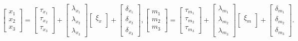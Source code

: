 \documentclass[
  man]{apa7}
\begin{document}
\begin{align}
    \begin{bmatrix}
        x_{1} \\
        x_{2} \\ 
        x_{3}
    \end{bmatrix} =
    \begin{bmatrix}
        \tau_{x_{1}} \\
        \tau_{x_{2}} \\ 
        \tau_{x_{3}}
    \end{bmatrix} +
    \begin{bmatrix}
        \lambda_{x_{1}} \\
        \lambda_{x_{2}} \\ 
        \lambda_{x_{3}}
    \end{bmatrix}
    \begin{bmatrix}
        \xi_{x} \\
    \end{bmatrix} +
    \begin{bmatrix}
        \delta_{x_{1}} \\
        \delta_{x_{2}} \\ 
        \delta_{x_{3}}
    \end{bmatrix}, %
    \begin{bmatrix}
        m_{1} \\
        m_{2} \\ 
        m_{3}
    \end{bmatrix} =
    \begin{bmatrix}
        \tau_{m_{1}} \\
        \tau_{m_{2}} \\ 
        \tau_{m_{3}}
    \end{bmatrix} +
    \begin{bmatrix}
        \lambda_{m_{1}} \\
        \lambda_{m_{2}} \\ 
        \lambda_{m_{3}}
    \end{bmatrix}
    \begin{bmatrix}
        \xi_{m} \\
    \end{bmatrix} +
    \begin{bmatrix}
        \delta_{m_{1}} \\
        \delta_{m_{2}} \\ 
        \delta_{m_{3}}
    \end{bmatrix}.
\end{align}
\end{document}
